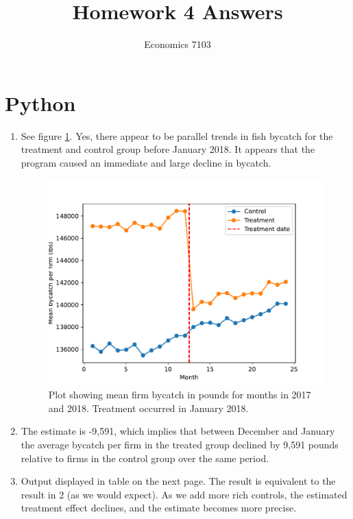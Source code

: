 \documentclass{article}
\title{Homework 4 Answers}
\author{Economics 7103}
\date{ }
\begin{document}
  
\maketitle

\section{Python}

\begin{enumerate}
\item See figure \ref{fig:hw4_q1}.  Yes, there appear to be parallel trends in fish bycatch for the treatment and control group before January 2018.  It appears that the program caused an immediate and large decline in bycatch.
\begin{figure}[h]
    \centering
    \includegraphics[scale = 0.7]{hw4_q1.pdf}
    \caption{Plot showing mean firm bycatch in pounds for months in 2017 and 2018.  Treatment occurred in January 2018.}
    \label{fig:hw4_q1}
\end{figure}
\item The estimate is -9,591, which implies that between December and January the average bycatch per firm in the treated group declined by 9,591 pounds relative to firms in the control group over the same period.
\item Output displayed in table on the next page.  The result is equivalent to the result in 2 (as we would expect).  As we add more rich controls, the estimated treatment effect declines, and the estimate becomes more precise.
\end{enumerate}
\end{document}
